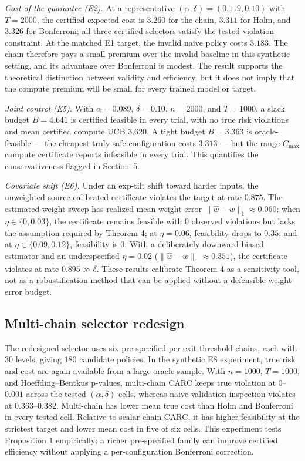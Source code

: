 \documentclass{ieeeaccess}
\begin{document}
\emph{Cost of the guarantee (E2).} At a representative $(\alpha,\delta)=(0.119,0.10)$ with $T=2000$, the certified expected cost is $3.260$ for the chain, $3.311$ for Holm, and $3.326$ for Bonferroni; all three certified selectors satisfy the tested violation constraint. At the matched E1 target, the invalid naive policy costs $3.183$. The chain therefore pays a small premium over the invalid baseline in this synthetic setting, and its advantage over Bonferroni is modest. The result supports the theoretical distinction between validity and efficiency, but it does not imply that the compute premium will be small for every trained model or target.

\emph{Joint control (E5).} With $\alpha=0.089$, $\delta=0.10$, $n=2000$, and $T=1000$, a slack budget $B=4.641$ is certified feasible in every trial, with no true risk violations and mean certified compute UCB $3.620$. A tight budget $B=3.363$ is oracle-feasible --- the cheapest truly safe configuration costs $3.313$ --- but the range-$C_{\max}$ compute certificate reports infeasible in every trial. This quantifies the conservativeness flagged in Section~5.

\emph{Covariate shift (E6).} Under an exp-tilt shift toward harder inputs, the unweighted source-calibrated certificate violates the target at rate $0.875$. The estimated-weight sweep has realized mean weight error $\|\hat w-w\|_1\approx0.060$: when $\eta\in\{0,0.03\}$, the certificate remains feasible with $0$ observed violations but lacks the assumption required by Theorem 4; at $\eta=0.06$, feasibility drops to $0.35$; and at $\eta\in\{0.09,0.12\}$, feasibility is $0$. With a deliberately downward-biased estimator and an underspecified $\eta=0.02$ ($\|\hat w-w\|_1\approx0.351$), the certificate violates at rate $0.895\gg\delta$. These results calibrate Theorem 4 as a sensitivity tool, not as a robustification method that can be applied without a defensible weight-error budget.

\subsection{Multi-chain selector redesign}

The redesigned selector uses six pre-specified per-exit threshold chains, each with 30 levels, giving 180 candidate policies. In the synthetic E8 experiment, true risk and cost are again available from a large oracle sample. With $n=1000$, $T=1000$, and Hoeffding--Bentkus p-values, multi-chain CARC keeps true violation at $0$--$0.001$ across the tested $(\alpha,\delta)$ cells, whereas naive validation inspection violates at $0.363$--$0.382$. Multi-chain has lower mean true cost than Holm and Bonferroni in every tested cell. Relative to scalar-chain CARC, it has higher feasibility at the strictest target and lower mean cost in five of six cells. This experiment tests Proposition 1 empirically: a richer pre-specified family can improve certified efficiency without applying a per-configuration Bonferroni correction.
\end{document}
